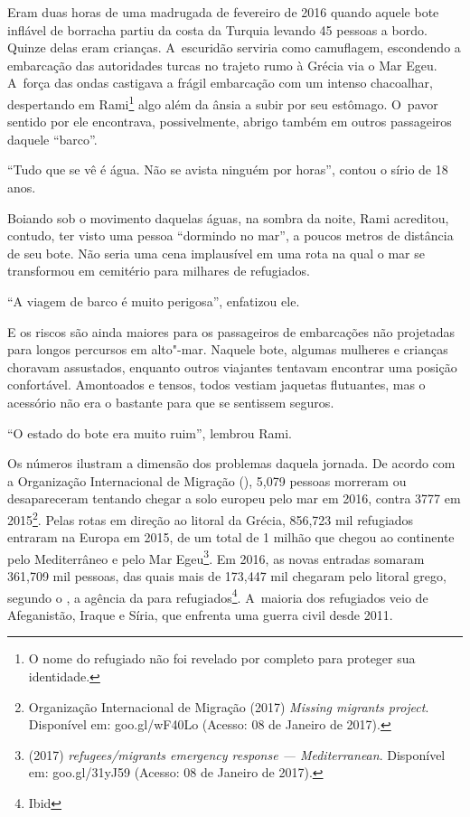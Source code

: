  

Eram duas horas de uma madrugada de fevereiro de 2016 quando aquele bote
inflável de borracha partiu da costa da Turquia levando 45 pessoas a
bordo. Quinze delas eram crianças. A~escuridão serviria como camuflagem,
escondendo a embarcação das autoridades turcas no trajeto rumo à Grécia
via o Mar Egeu. A~força das ondas castigava a frágil embarcação com um
intenso chacoalhar, despertando em Rami\footnote{ O nome do refugiado não foi revelado por completo
para proteger sua identidade.}  algo além da
ânsia a subir por seu estômago. O~pavor sentido por ele encontrava,
possivelmente, abrigo também em outros passageiros daquele ``barco''.

``Tudo que se vê é água. Não se avista ninguém por horas'', contou o
sírio de 18 anos.

Boiando sob o movimento daquelas águas, na sombra da noite, Rami
acreditou, contudo, ter visto uma pessoa ``dormindo no mar'', a poucos
metros de distância de seu bote. Não seria uma cena implausível em uma
rota na qual o mar se transformou em cemitério para milhares de
refugiados.

``A viagem de barco é muito perigosa'', enfatizou ele.

E os riscos são ainda maiores para os passageiros de embarcações não
projetadas para longos percursos em alto"-mar. Naquele bote, algumas
mulheres e crianças choravam assustados, enquanto outros viajantes
tentavam encontrar uma posição confortável. Amontoados e tensos, todos
vestiam jaquetas flutuantes, mas o acessório não era o bastante para que
se sentissem seguros.

``O estado do bote era muito ruim'', lembrou Rami.

Os números ilustram a dimensão dos problemas daquela jornada. De acordo
com a Organização Internacional de Migração (), 5,079 pessoas
morreram ou desapareceram tentando chegar a solo europeu pelo mar em
2016, contra 3777 em 2015\footnote{ Organização Internacional de Migração (2017)
\emph{Missing migrants project}. Disponível em:
{goo.gl/wF40Lo}
(Acesso: 08 de Janeiro de 2017).}. Pelas rotas em direção ao
litoral da Grécia, 856,723 mil refugiados entraram na Europa em 2015, de
um total de 1 milhão que chegou ao continente pelo Mediterrâneo e pelo
Mar Egeu\footnote{  (2017) \emph{ refugees/migrants emergency
response --- Mediterranean}. Disponível em:
goo.gl/31yJ59
(Acesso: 08 de Janeiro
de 2017).}. Em 2016, as novas entradas somaram 361,709
mil pessoas, das quais mais de 173,447 mil chegaram pelo litoral grego,
segundo o , a agência da  para refugiados\footnote{ Ibid}. A~maioria dos refugiados veio de Afeganistão, Iraque e Síria, que enfrenta
uma guerra civil desde 2011.

